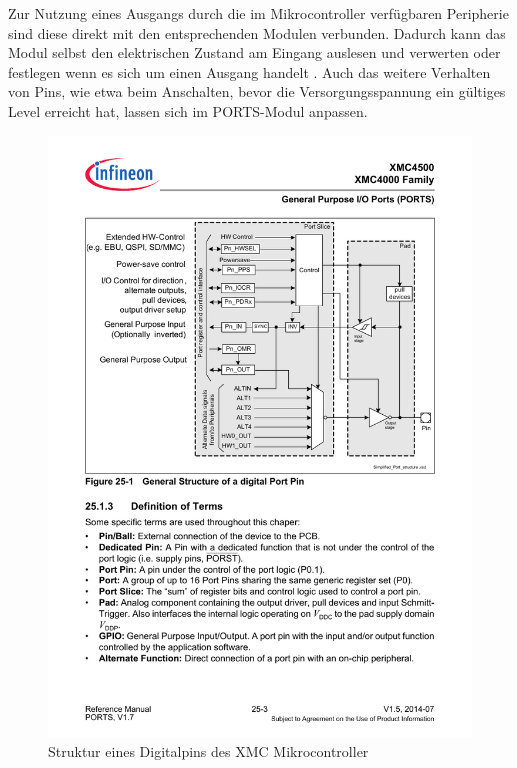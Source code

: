 Zur Nutzung eines Ausgangs durch die im Mikrocontroller verfügbaren Peripherie sind diese direkt mit den entsprechenden Modulen verbunden. Dadurch kann das Modul selbst den elektrischen Zustand am Eingang auslesen und verwerten oder festlegen wenn es sich um einen Ausgang handelt \cite{XMC-Reference}. 
Auch das weitere Verhalten von Pins, wie etwa  beim Anschalten, bevor die Versorgungsspannung ein gültiges Level erreicht hat, lassen sich im PORTS-Modul anpassen.
\begin{figure}[h]
	\centering
	\includegraphics[width=0.7\linewidth]{Abbildungen/StructureDigitalPin}
	\caption{Struktur eines Digitalpins des XMC Mikrocontroller \cite{XMC-Reference}}
	\label{fig:structuredigitalpin}
\end{figure}


